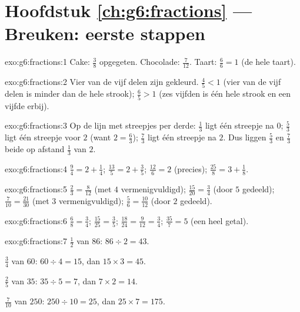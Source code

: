 \section*{Hoofdstuk \ref{ch:g6:fractions} --- Breuken: eerste stappen}

\begin{solution}{exo:g6:fractions:1}
Cake: $\frac38$ opgegeten. \quad Chocolade: $\frac{7}{12}$. \quad
Taart: $\frac66 = 1$ (de hele taart).
\end{solution}

\begin{solution}{exo:g6:fractions:2}
Vier van de vijf delen zijn gekleurd. $\frac45 < 1$ (vier van de vijf delen is
minder dan de hele strook); $\frac65 > 1$ (zes vijfden is één hele strook en
een vijfde erbij).
\end{solution}

\begin{solution}{exo:g6:fractions:3}
Op de lijn met streepjes per derde: $\frac13$ ligt één streepje na $0$;
$\frac53$ ligt één streepje voor $2$ (want $2 = \frac63$); $\frac73$ ligt één
streepje na $2$. Dus liggen $\frac53$ en $\frac73$ beide op afstand $\frac13$
van $2$.
\end{solution}

\begin{solution}{exo:g6:fractions:4}
$\frac94 = 2 + \frac14$; \quad
$\frac{13}{5} = 2 + \frac35$; \quad
$\frac{12}{6} = 2$ (precies); \quad
$\frac{25}{8} = 3 + \frac18$.
\end{solution}

\begin{solution}{exo:g6:fractions:5}
$\frac23 = \frac{8}{12}$ (met $4$ vermenigvuldigd); \quad
$\frac{15}{20} = \frac34$ (door $5$ gedeeld); \quad
$\frac{7}{10} = \frac{21}{30}$ (met $3$ vermenigvuldigd); \quad
$\frac56 = \frac{10}{12}$ (door $2$ gedeeld).
\end{solution}

\begin{solution}{exo:g6:fractions:6}
$\frac68 = \frac34$; \quad
$\frac{15}{25} = \frac35$; \quad
$\frac{18}{24} = \frac{9}{12} = \frac34$; \quad
$\frac{35}{7} = 5$ (een heel getal).
\end{solution}

\begin{solution}{exo:g6:fractions:7}
$\frac12$ van $86$: $86 \div 2 = 43$.

$\frac34$ van $60$: $60 \div 4 = 15$, dan $15 \times 3 = 45$.

$\frac25$ van $35$: $35 \div 5 = 7$, dan $7 \times 2 = 14$.

$\frac{7}{10}$ van $250$: $250 \div 10 = 25$, dan $25 \times 7 = 175$.
\end{solution}

